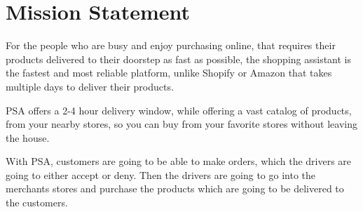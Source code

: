 \section{Mission Statement}
For the people who are busy and enjoy purchasing online, that requires their 
products delivered to their doorstep as fast as possible, the shopping 
assistant is the fastest and most reliable platform, unlike Shopify or 
Amazon that takes multiple days to deliver their products. \newline

\noindent PSA offers a 2-4 hour delivery window, while offering a vast catalog of 
products, from your nearby stores, so you can buy from your favorite stores 
without leaving the house. \newline

\noindent With PSA, customers are going to be able to make orders, which the drivers are 
going to either accept or deny. Then the drivers are going to go into the 
merchants stores and purchase the products which are going to be delivered
to the customers.
